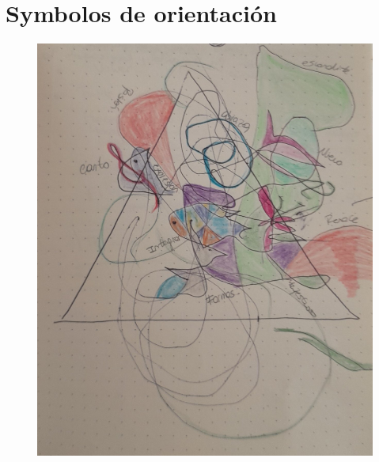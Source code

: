 \documentclass[12pt, a4paper, twoside]{book} %
\begin{document}
\chapter{Symbolos de orientación}

\begin{figure}[H]
	\centering
	\includegraphics[width=\textwidth]{./images/1f81324dd960fe.jpg}
\end{figure}
\end{document}
